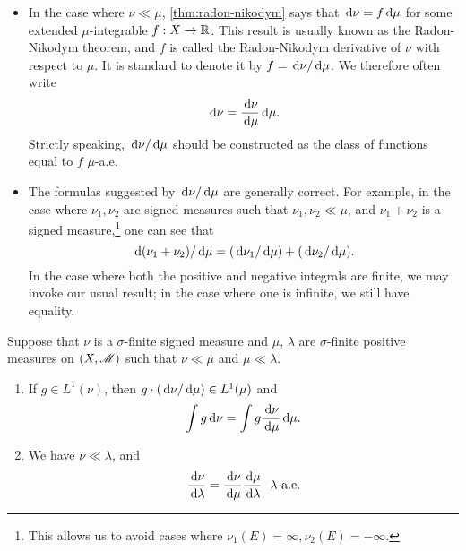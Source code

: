 \documentclass[12pt]{article} %
\begin{document}
\begin{remark}
    \begin{itemize}
        \item In the case where $\nu \ll \mu$, \cref{thm:radon-nikodym} says that $\, \mathrm{d} \nu = f \, \mathrm{d} \mu$ for some extended $\mu$-integrable $f : X \to \mathbb{R}$. This result is usually known as the Radon-Nikodym theorem, and $f$ is called the Radon-Nikodym derivative of $\nu$ with respect to $\mu$. It is standard to denote it by $f = \, \mathrm{d}\nu / \, \mathrm{d}\mu$. We therefore often write \[\, \mathrm{d} \nu = \frac{\, \mathrm{d}\nu}{\, \mathrm{d}\mu}{\, \mathrm{d} \mu}.\] Strictly speaking, $\, \mathrm{d}\nu / \, \mathrm{d}\mu$ should be constructed as the class of functions equal to $f$ $\mu$-a.e. 
        \item The formulas suggested by $\, \mathrm{d}\nu/\, \mathrm{d}\mu$ are generally correct. For example, in the case where $\nu_1, \nu_2$ are signed measures such that $\nu_1, \nu_2 \ll \mu$, and $\nu_1 + \nu_2$ is a signed measure,\footnote{This allows us to avoid cases where $\nu_1(E) = \infty, \nu_2(E) = - \infty$.} one can see that  \[\, \mathrm{d}(\nu_1 + \nu_2) / \, \mathrm{d} \mu = (\, \mathrm{d}\nu_1/\, \mathrm{d}\mu) + (\, \mathrm{d}\nu_2/\, \mathrm{d}\mu).\] In the case where both the positive and negative integrals are finite, we may invoke our usual result; in the case where one is infinite, we still have equality.
    \end{itemize}
\end{remark}

\begin{proposition}\label{prop:chain-rule}
    Suppose that $\nu$ is a $\sigma$-finite signed measure and $\mu$, $\lambda$ are $\sigma$-finite positive measures on $(X, \mathscr{M})$ such that $\nu \ll \mu$ and $\mu \ll \lambda$. \begin{enumerate}
        \item If $g \in L^1(\nu)$, then $g \cdot (\, \mathrm{d}\nu/\, \mathrm{d}\mu) \in L^1(\mu)$ and \[\int g \, \mathrm{d} \nu = \int g \frac{\, \mathrm{d} \nu}{\, \mathrm{d}\mu}\, \mathrm{d}\mu.\]
        \item We have $\nu \ll \lambda$, and \[\frac{\d\nu}{\d\lambda} = \frac{\d\nu}{\d\mu} \frac{\d\mu}{\d\lambda} \ \ \lambda\text{-a.e.}\]
    \end{enumerate}
\end{proposition}
\end{document}

